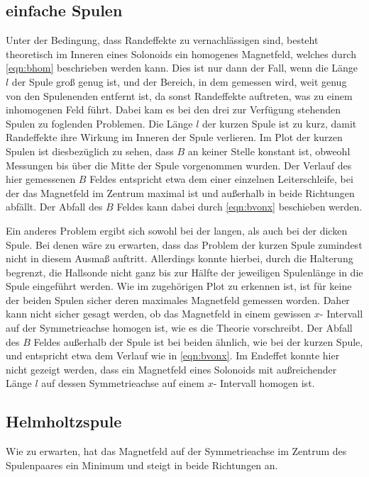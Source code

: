     \subsection{einfache Spulen}
        Unter der Bedingung, dass Randeffekte zu vernachlässigen sind, besteht theoretisch im Inneren eines Solonoids ein
        homogenes Magnetfeld, welches durch \ref{eqn:bhom} beschrieben werden kann. Dies ist nur dann der Fall, wenn die Länge $l$
        der Spule groß genug ist, und der Bereich, in dem gemessen wird, weit genug von den Spulenenden entfernt ist, da sonst
        Randeffekte auftreten, was zu einem inhomogenen Feld führt. Dabei kam es bei den drei zur Verfügung stehenden Spulen zu
        foglenden Problemen. Die Länge $l$ der kurzen Spule ist zu kurz, damit Randeffekte ihre Wirkung im Inneren der Spule verlieren.
        Im Plot der kurzen Spulen ist diesbezüglich zu sehen, dass $B$ an keiner Stelle konstant ist, obweohl Messungen bis über die
        Mitte der Spule vorgenommen wurden. Der Verlauf des hier gemessenen $B$ Feldes entspricht etwa dem einer einzelnen Leiterschleife,
        bei der das Magnetfeld im Zentrum maximal ist und außerhalb in beide Richtungen abfällt. Der Abfall des $B$ Feldes kann dabei
        durch \ref{eqn:bvonx} beschieben werden. 

        Ein anderes Problem ergibt sich sowohl bei der langen, als auch bei der dicken Spule. Bei denen wäre zu erwarten, dass 
        das Problem der kurzen Spule zumindest nicht in diesem Ausmaß auftritt. Allerdings konnte hierbei, durch die Halterung begrenzt,
        die Hallsonde nicht ganz bis zur Hälfte der jeweiligen Spulenlänge in die Spule eingeführt werden. Wie im zugehörigen Plot
        zu erkennen ist, ist für keine der beiden Spulen sicher deren maximales Magnetfeld gemessen worden. Daher kann nicht sicher 
        gesagt werden, ob das Magnetfeld in einem gewissen $x$- Intervall auf der Symmetrieachse homogen ist, wie es die Theorie vorschreibt.
        Der Abfall des $B$ Feldes außerhalb der Spule ist bei beiden ähnlich, wie bei der kurzen Spule, und entspricht etwa dem Verlauf
        wie in \ref{eqn:bvonx}. 
        Im Endeffet konnte hier nicht gezeigt werden, dass ein Magnetfeld eines Solonoids mit außreichender Länge $l$ auf dessen
        Symmetrieachse auf einem $x$- Intervall homogen ist. 

    \subsection{Helmholtzspule}
        Wie zu erwarten, hat das Magnetfeld auf der Symmetrieachse im Zentrum des Spulenpaares ein Minimum und steigt in beide 
        Richtungen an. 
